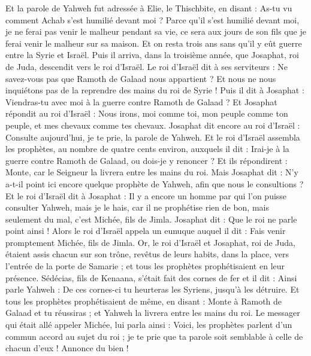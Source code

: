\begin{multicols}{2}
Et la parole de Yahweh fut adressée à Elie, le Thischbite, en disant :
As-tu vu comment Achab s'est humilié devant moi ? Parce qu'il s'est humilié devant moi, je ne ferai pas venir le malheur pendant sa vie, ce sera aux jours de son fils que je ferai venir le malheur sur sa maison.
\VerseOne{}Et on resta trois ans sans qu'il y eût guerre entre la Syrie et Israël.
Puis il arriva, dans la troisième année, que Josaphat, roi de Juda, descendit vers le roi d'Israël.
Le roi d'Israël dit à ses serviteurs : Ne savez-vous pas que Ramoth de Galaad nous appartient ? Et nous ne nous inquiétons pas de la reprendre des mains du roi de Syrie !
Puis il dit à Josaphat : Viendras-tu avec moi à la guerre contre Ramoth de Galaad ? Et Josaphat répondit au roi d'Israël : Nous irons, moi comme toi, mon peuple comme ton peuple, et mes chevaux comme tes chevaux.
Josaphat dit encore au roi d'Israël : Consulte aujourd'hui, je te prie, la parole de Yahweh.
Et le roi d'Israël assembla les prophètes, au nombre de quatre cents environ, auxquels il dit : Irai-je à la guerre contre Ramoth de Galaad, ou dois-je y renoncer ? Et ils répondirent : Monte, car le Seigneur la livrera entre les mains du roi.
Mais Josaphat dit : N'y a-t-il point ici encore quelque prophète de Yahweh, afin que nous le consultions ?
Et le roi d'Israël dit à Josaphat : Il y a encore un homme par qui l'on puisse consulter Yahweh, mais je le hais, car il ne prophétise rien de bon, mais seulement du mal, c'est Michée, fils de Jimla. Josaphat dit : Que le roi ne parle point ainsi !
Alors le roi d'Israël appela un eunuque auquel il dit : Fais venir promptement Michée, fils de Jimla.
Or, le roi d'Israël et Josaphat, roi de Juda, étaient assis chacun sur son trône, revêtus de leurs habits, dans la place, vers l'entrée de la porte de Samarie ; et tous les prophètes prophétisaient en leur présence.
Sédécias, fils de Kenaana, s'était fait des cornes de fer et il dit : Ainsi parle Yahweh : De ces cornes-ci tu heurteras les Syriens, jusqu'à les détruire.
Et tous les prophètes prophétisaient de même, en disant : Monte à Ramoth de Galaad et tu réussiras ; et Yahweh la livrera entre les mains du roi.
Le messager qui était allé appeler Michée, lui parla ainsi : Voici, les prophètes parlent d'un commun accord au sujet du roi ; je te prie que ta parole soit semblable à celle de chacun d'eux ! Annonce du bien !

\end{multicols}
